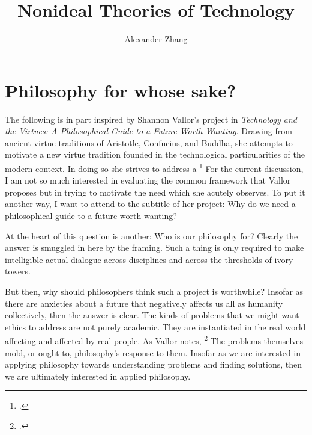 \documentclass[letterpaper,notitlepage,12pt]{article}
\title{Nonideal Theories of Technology}
\author{Alexander Zhang}
\date{}
\begin{document}
\maketitle

\section{Philosophy for whose sake?}

The following is in part inspired by Shannon Vallor's project in
  \textit{Technology and the Virtues: A Philosophical Guide to a Future Worth
  Wanting}.
Drawing from ancient virtue traditions of Aristotle, Confucius, and Buddha, she
  attempts to motivate a new virtue tradition founded in the technological
  particularities of the modern context.
In doing so she strives to address a \footcite[p. 9]{vallor_technology_2018}
For the current discussion, I am not so much interested in evaluating the common
  framework that Vallor proposes but in trying to motivate the need which she
  acutely observes.
To put it another way, I want to attend to the subtitle of her project: Why do
  we need a philosophical guide to a future worth wanting?

At the heart of this question is another: Who is our philosophy for?
Clearly the answer is smuggled in here by the framing.
Such a thing is only required to make intelligible actual dialogue across
  disciplines and across the thresholds of ivory towers.

But then, why should philosophers think such a project is worthwhile?
Insofar as there are anxieties about a future that negatively affects us all as
  humanity collectively, then the answer is clear.
The kinds of problems that we might want ethics to address are not purely
  academic.
They are instantiated in the real world affecting and affected by real people.
As Vallor notes, \footcite[p. 23]{vallor_technology_2018}
The problems themselves mold, or ought to, philosophy's response to them.
Insofar as we are interested in applying philosophy towards understanding
  problems and finding solutions, then we are ultimately interested in applied
  philosophy.
\end{document}
